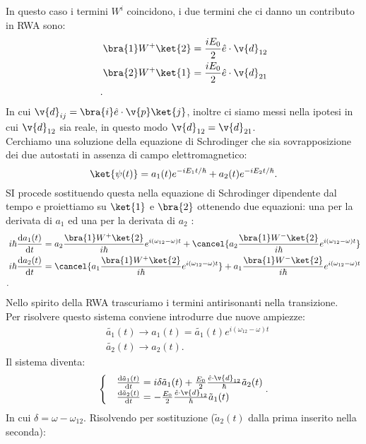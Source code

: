 In questo caso i termini $W^i$ coincidono, i due termini che ci danno un contributo in RWA sono:
\[\begin{aligned}
    &\bra{1}W^+\ket{2} = \frac{iE_0}{2}\hat{e}\cdot \v{d}_{12}\\
    &\bra{2}W^+\ket{1} = \frac{iE_0}{2}\hat{e}\cdot \v{d}_{21}\\
.\end{aligned}\]
In cui $\v{d}_{ij}=\bra{i}\hat{e}\cdot \v{p}\ket{j}$, inoltre ci siamo messi nella ipotesi in cui $\v{d}_{12}$ sia reale, in questo modo $\v{d}_{12}=\v{d}_{21}$.\\
Cerchiamo una soluzione della equazione di Schrodinger che sia sovrapposizione dei due autostati in assenza di campo elettromagnetico:
\[
    \ket{\psi(t) } = a_1(t) e^{-iE_1t /\hbar } + a_2(t) e^{-iE_2t /\hbar } 
.\] 
SI procede sostituendo questa nella equazione di Schrodinger dipendente dal tempo e proiettiamo su $\ket{1}$ e $\bra{2}$ ottenendo due equazioni: una per la derivata di $a_1$ ed una per la derivata di $a_2$ :
\[\begin{aligned}
    &i\hbar   \frac{\text{d} a_1(t) }{\text{d} t} =
    a_2 \frac{\bra{1}W^+\ket{2}}{i\hbar }e^{i(\omega_{12}-\omega) t}
    +
    \cancel{a_2\frac{\bra{1}W^-\ket{2}}{i\hbar }e^{i(\omega_{12}-\omega) t}}\\
    &i\hbar   \frac{\text{d} a_2(t) }{\text{d} t} =
    \cancel{a_1 \frac{\bra{1}W^+\ket{2}}{i\hbar }e^{i(\omega_{12}-\omega) t}}
    +
    a_1\frac{\bra{1}W^-\ket{2}}{i\hbar }e^{i(\omega_{12}-\omega) t}\\
.\end{aligned}\]
Nello spirito della RWA trascuriamo i termini antirisonanti nella transizione.\\
Per risolvere questo sistema conviene introdurre due nuove ampiezze:
\[\begin{aligned}
    &\tilde{a_1}(t) \to a_1(t) = \tilde{a_1}(t) e^{i(\omega_{12}-\omega) t}\\
    &\tilde{a_2}(t) \to a_2(t)
.\end{aligned}\]
Il sistema diventa:
\[
\begin{cases}
    &\frac{\text{d} \tilde{a}_1(t) }{\text{d} t} = i \delta\tilde{a}_1(t) 
    + \frac{E_0}{2}\frac{\hat{e}\cdot \v{d}_{12}}{\hbar }\tilde{a}_2(t) \\
    &\frac{\text{d} \tilde{a}_2(t)}{\text{d} t} = -\frac{E_0}{2}\frac{\hat{e}\cdot \v{d}_{12}}{\hbar }\tilde{a}_1(t) 
\end{cases}
.\] 
In cui $\delta  =\omega-\omega_{12}$. Risolvendo per sostituzione ($\tilde{a}_2(t)$ dalla prima inserito nella seconda):
